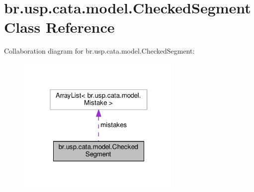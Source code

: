 \hypertarget{classbr_1_1usp_1_1cata_1_1model_1_1_checked_segment}{\section{br.\+usp.\+cata.\+model.\+Checked\+Segment Class Reference}
\label{classbr_1_1usp_1_1cata_1_1model_1_1_checked_segment}
}


Collaboration diagram for br.\+usp.\+cata.\+model.\+Checked\+Segment\+:\nopagebreak
\begin{figure}[H]
\begin{center}
\leavevmode
\includegraphics[width=226pt]{classbr_1_1usp_1_1cata_1_1model_1_1_checked_segment__coll__graph}
\end{center}
\end{figure}
